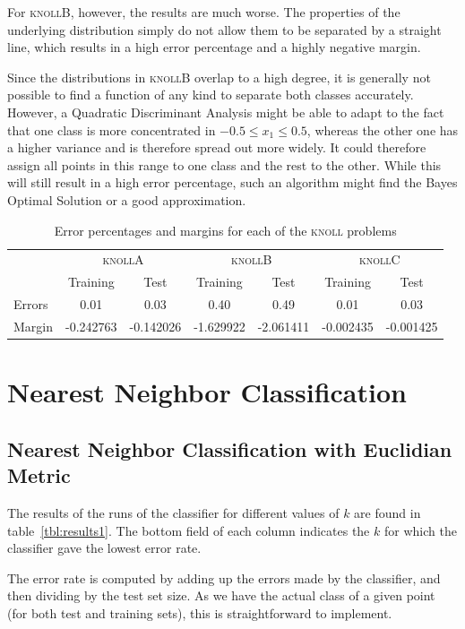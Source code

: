 \documentclass{article}
\newcommand{\knollA}{\textsc{knollA}\xspace}
\newcommand{\knollB}{\textsc{knollB}\xspace}
\newcommand{\knollC}{\textsc{knollC}\xspace}
\begin{document}
For \knollB, however, the results are much worse. The properties of the underlying distribution simply
do not allow them to be separated by a straight line, which results in a high error percentage and a highly negative margin.

Since the distributions in \knollB overlap to a high degree, it is generally not possible to find a function of any kind
to separate both classes accurately. However, a Quadratic Discriminant Analysis might be able to adapt to the fact that one class
is more concentrated in $-0.5 \leq x_1 \leq 0.5$, whereas the other one has a higher variance and is therefore spread out more widely.
It could therefore assign all points in this range to one class and the rest to the other. While this will still result in a high
error percentage, such an algorithm might find the Bayes Optimal Solution or a good approximation.

\begin{table}[h!]
  \centering
  \begin{tabular}{l|c|c|c|c|c|c}
    & \multicolumn{2}{c|}{\knollA} & \multicolumn{2}{|c|}{\knollB} & \multicolumn{2}{|c}{\knollC} \\
    & Training & Test & Training & Test & Training & Test \\
    \hline
    Errors & 0.01 & 0.03 & 0.40 & 0.49 & 0.01 & 0.03 \\ 
    Margin & -0.242763 & -0.142026 & -1.629922 & -2.061411 & -0.002435 & -0.001425 \\
  \end{tabular}
  \caption{Error percentages and margins for each of the \textsc{knoll} problems}
  \label{tab:ldaknollerror}
\end{table}

\newpage
\section{Nearest Neighbor Classification}

\subsection{Nearest Neighbor Classification with Euclidian Metric}

The results of the runs of the classifier for different values of $k$
are found in table~\ref{tbl:results1}. The bottom field of each column
indicates the $k$ for which the classifier gave the lowest error rate.

The error rate is computed by adding up the errors made by the
classifier, and then dividing by the test set size. As we have the
actual class of a given point (for both test and training sets), this
is straightforward to implement.
\end{document}
